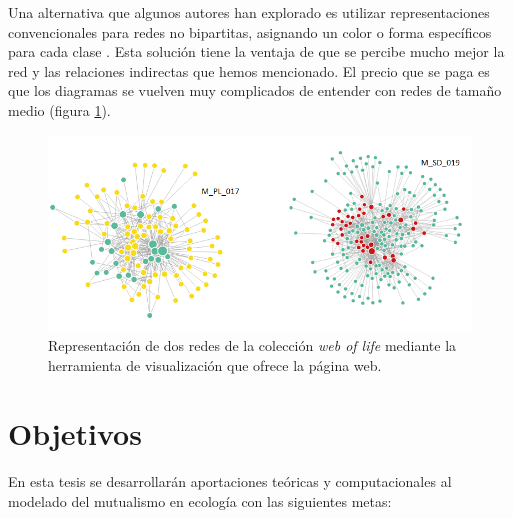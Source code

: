 Una alternativa que algunos autores han explorado es utilizar representaciones convencionales para redes no bipartitas, asignando un color o forma específicos para cada clase \cite{mello2011missing,genini2010cheaters,toju2014assembly}. Esta solución tiene la ventaja de que se percibe mucho mejor la red y las relaciones indirectas que hemos mencionado. El precio que se paga es que los diagramas se vuelven muy complicados de entender con redes de tamaño medio (figura \ref{fig:VIS_grafos_weboflife}).

\begin{figure}[h!]
\centering
\includegraphics[scale=0.75]{Figures/VIS_grafos_weboflife.png}
\caption{Representación de dos redes de la colección \textit{web of  life} mediante la herramienta de visualización que ofrece la página web.}
\label{fig:VIS_grafos_weboflife}
\end{figure}

\clearpage
\section{Objetivos}

En esta tesis se desarrollarán aportaciones teóricas y computacionales al modelado del mutualismo en ecología con las siguientes metas:

